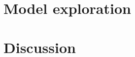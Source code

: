 \documentclass[3p,times,procedia]{elsarticle}
\begin{document}
\cite{martin2016strategies} %

\section{Model exploration}


\section{Discussion}




%



\clearpage
\end{document}
